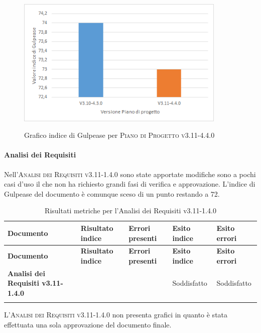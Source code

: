 \begin{figure}[H]
  \centering
  \includegraphics[width=10cm]{img/gulpeasePdPv3.11-4.4.0.png}
  \label{fig:gulpease_pdq}
  \caption{Grafico indice di Gulpease per \textsc{Piano di Progetto v3.11-4.4.0}}
\end{figure}


\paragraph{Analisi dei Requisiti}
\label{sub:analisi_dei_requisiti}
Nell'\textsc{Analisi dei Requisiti v3.11-1.4.0} sono state apportate modifiche sono a pochi casi d'uso il che non ha richiesto grandi fasi di verifica e approvazione.
L'indice di Gulpease del documento è comunque sceso di un punto restando a 72.

\renewcommand{\arraystretch}{2} %
\begin{longtable}[H]{>{\centering\bfseries}m{6cm} >{\centering}m{2cm} >{\centering}m{2.5cm} >{\centering}m{2.5cm} >{\centering\arraybackslash}m{2.5cm}}  
  \rowcolor{lightgray}
  {\textbf{Documento}} & {\textbf{Risultato indice}} & {\textbf{Errori presenti}} & {\textbf{Esito indice}} & {\textbf{Esito errori}}  \\
  \endfirsthead%
  \rowcolor{lightgray}
  {\textbf{Documento}} & {\textbf{Risultato indice}} & {\textbf{Errori presenti}} & {\textbf{Esito indice}} & {\textbf{Esito errori}}  \\
  \endhead%
  \textbf{Analisi dei Requisiti v3.11-1.4.0} &  72              & 0               & Soddisfatto & Soddisfatto \\
  \caption{Risultati metriche per l'Analisi dei Requisiti v3.11-1.4.0}
  \label{tab:my-table}
\end{longtable}

L'\textsc{Analisi dei Requisiti v3.11-1.4.0} non presenta grafici in quanto è stata effettuata una sola approvazione del documento finale.



